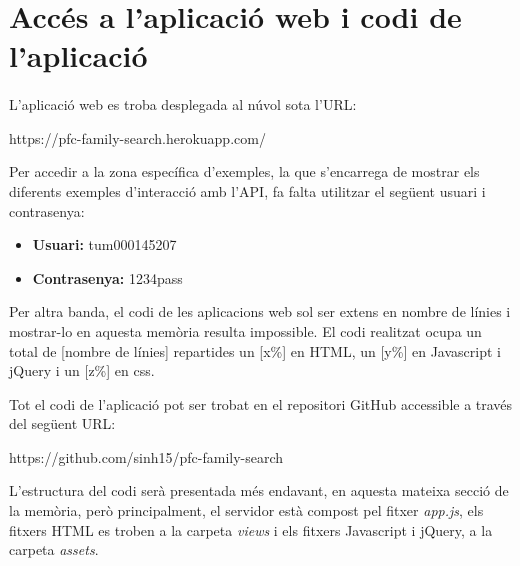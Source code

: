 \section{Accés a l'aplicació web i codi de l'aplicació}

    \paragraph{}
    L’aplicació web es troba desplegada al núvol sota l'URL:

    \begin{displayquote}
        https://pfc-family-search.herokuapp.com/
    \end{displayquote}

    Per accedir a la zona específica d’exemples, la que s’encarrega de mostrar els diferents exemples d’interacció amb l’API, fa falta utilitzar el següent usuari i contrasenya:

    \begin{itemize}
        \item \textbf{Usuari:} tum000145207
        \item \textbf{Contrasenya:} 1234pass
    \end{itemize}

    Per altra banda, el codi de les aplicacions web sol ser extens en nombre de línies i mostrar-lo en aquesta memòria resulta impossible. El codi realitzat ocupa un total de [nombre de línies] repartides un [x\%] en HTML, un [y\%] en Javascript i jQuery i un [z\%] en css.

    Tot el codi de l’aplicació pot ser trobat en el repositori GitHub accessible a través del següent URL:

    \begin{displayquote}
        https://github.com/sinh15/pfc-family-search
    \end{displayquote}

    L’estructura del codi serà presentada més endavant, en aquesta mateixa secció de la memòria, però principalment, el servidor està compost pel fitxer \emph{app.js}, els fitxers HTML es troben a la carpeta \emph{views} i els fitxers Javascript i jQuery, a la carpeta \emph{assets}.
